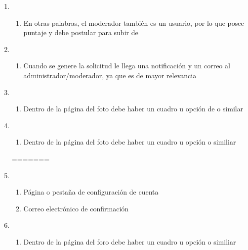 \documentclass[12pt, letterpaper, notitlepage]{article}
\begin{document}
\begin{enumerate}
		
		\item {}
		\begin{enumerate}
			\item En otras palabras, el moderador también es un usuario, por lo que posee puntaje y debe postular para subir de 
		\end{enumerate}

	\item {}
		\begin{enumerate}
			\item Cuando se genere la solicitud le llega una notificación y un correo al administrador/moderador, ya que es de mayor relevancia
		\end{enumerate}
		
		   \item {}
       	\begin{enumerate}
			\item Dentro de la página del foto debe haber un cuadro u opción de  o similar
		\end{enumerate}
		
		   \item {}
       	\begin{enumerate}
			\item Dentro de la página del foto debe haber un cuadro u opción  o similiar
		\end{enumerate}
		
=======
		
		
		\item {}
		\begin{enumerate}
			\item Página o pestaña de configuración de cuenta
			\item Correo electrónico de confirmación
		\end{enumerate}
		
		
		\item {}
		\begin{enumerate}
			\item Dentro de la página del foro debe haber un cuadro u opción  o similiar
		\end{enumerate}
		

\end{enumerate}
\end{document}
